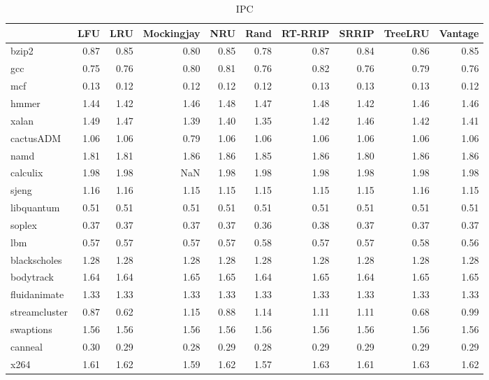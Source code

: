 \begin{table}
\caption{IPC}
\label{tab:ipc}
\begin{tabular}{lrrrrrrrrr}
\toprule
 & LFU & LRU & Mockingjay & NRU & Rand & RT-RRIP & SRRIP & TreeLRU & Vantage \\
\midrule
bzip2 & 0.87 & 0.85 & 0.80 & 0.85 & 0.78 & 0.87 & 0.84 & 0.86 & 0.85 \\
gcc & 0.75 & 0.76 & 0.80 & 0.81 & 0.76 & 0.82 & 0.76 & 0.79 & 0.76 \\
mcf & 0.13 & 0.12 & 0.12 & 0.12 & 0.12 & 0.13 & 0.13 & 0.13 & 0.12 \\
hmmer & 1.44 & 1.42 & 1.46 & 1.48 & 1.47 & 1.48 & 1.42 & 1.46 & 1.46 \\
xalan & 1.49 & 1.47 & 1.39 & 1.40 & 1.35 & 1.42 & 1.46 & 1.42 & 1.41 \\
cactusADM & 1.06 & 1.06 & 0.79 & 1.06 & 1.06 & 1.06 & 1.06 & 1.06 & 1.06 \\
namd & 1.81 & 1.81 & 1.86 & 1.86 & 1.85 & 1.86 & 1.80 & 1.86 & 1.86 \\
calculix & 1.98 & 1.98 & NaN & 1.98 & 1.98 & 1.98 & 1.98 & 1.98 & 1.98 \\
sjeng & 1.16 & 1.16 & 1.15 & 1.15 & 1.15 & 1.15 & 1.15 & 1.16 & 1.15 \\
libquantum & 0.51 & 0.51 & 0.51 & 0.51 & 0.51 & 0.51 & 0.51 & 0.51 & 0.51 \\
soplex & 0.37 & 0.37 & 0.37 & 0.37 & 0.36 & 0.38 & 0.37 & 0.37 & 0.37 \\
lbm & 0.57 & 0.57 & 0.57 & 0.57 & 0.58 & 0.57 & 0.57 & 0.58 & 0.56 \\
blackscholes & 1.28 & 1.28 & 1.28 & 1.28 & 1.28 & 1.28 & 1.28 & 1.28 & 1.28 \\
bodytrack & 1.64 & 1.64 & 1.65 & 1.65 & 1.64 & 1.65 & 1.64 & 1.65 & 1.65 \\
fluidanimate & 1.33 & 1.33 & 1.33 & 1.33 & 1.33 & 1.33 & 1.33 & 1.33 & 1.33 \\
streamcluster & 0.87 & 0.62 & 1.15 & 0.88 & 1.14 & 1.11 & 1.11 & 0.68 & 0.99 \\
swaptions & 1.56 & 1.56 & 1.56 & 1.56 & 1.56 & 1.56 & 1.56 & 1.56 & 1.56 \\
canneal & 0.30 & 0.29 & 0.28 & 0.29 & 0.28 & 0.29 & 0.29 & 0.29 & 0.29 \\
x264 & 1.61 & 1.62 & 1.59 & 1.62 & 1.57 & 1.63 & 1.61 & 1.63 & 1.62 \\
\bottomrule
\end{tabular}
\end{table}
